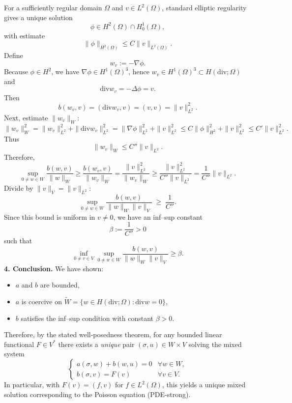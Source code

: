 For a sufficiently regular domain $\Omega$ and $v\in L^2(\Omega)$, standard elliptic
regularity gives a unique solution
\[
    \phi \in H^2(\Omega)\cap H_0^1(\Omega),
\]
with estimate
\[
    \|\phi\|_{H^2(\Omega)} \le C \|v\|_{L^2(\Omega)}.
\]
Define
\[
    w_v := -\nabla\phi.
\]
Because $\phi\in H^2$, we have $\nabla\phi \in H^1(\Omega)^3$, hence
$w_v\in H^1(\Omega)^3 \subset H(\mathrm{div};\Omega)$ and
\[
    \mathrm{div} w_v = -\Delta\phi = v.
\]
Then
\[
    b(w_v,v)
    = (\mathrm{div} w_v, v)
    = (v,v) = \|v\|_{L^2}^2.
\]
Next, estimate $\|w_v\|_W$:
\[
    \|w_v\|_W^2
    = \|w_v\|_{L^2}^2 + \|\mathrm{div} w_v\|_{L^2}^2
    = \|\nabla\phi\|_{L^2}^2 + \|v\|_{L^2}^2
    \le C\|\phi\|_{H^2}^2 + \|v\|_{L^2}^2
    \le C'\|v\|_{L^2}^2.
\]
Thus
\[
    \|w_v\|_W \le C'' \|v\|_{L^2}.
\]
Therefore,
\[
    \sup_{0\neq w\in W}
    \frac{b(w,v)}{\|w\|_W}
    \ge \frac{b(w_v,v)}{\|w_v\|_W}
    = \frac{\|v\|_{L^2}^2}{\|w_v\|_W}
    \ge \frac{\|v\|_{L^2}^2}{C''\|v\|_{L^2}}
    = \frac{1}{C''}\|v\|_{L^2}.
\]
Divide by $\|v\|_V = \|v\|_{L^2}$:
\[
    \sup_{0\neq w\in W}
    \frac{b(w,v)}{\|w\|_W\|v\|_V}
    \;\ge\; \frac{1}{C''}.
\]
Since this bound is uniform in $v\neq 0$, we have an inf--sup constant
\[
    \beta := \frac{1}{C''} > 0
\]
such that
\[
    \inf_{0\neq v\in V}
    \sup_{0\neq w\in W}
    \frac{b(w,v)}{\|w\|_W\|v\|_V}
    \ge \beta.
\]
\textbf{4. Conclusion.}
We have shown:
\begin{itemize}
    \item $a$ and $b$ are bounded,
    \item $a$ is coercive on $\widetilde W = \{ w\in H(\mathrm{div};\Omega) : \mathrm{div} w = 0\}$,
    \item $b$ satisfies the inf--sup condition with constant $\beta>0$.
\end{itemize}
Therefore, by the stated well-posedness theorem, for any bounded linear functional
$F\in V^\ast$ there exists a \emph{unique} pair $(\sigma,u)\in W\times V$ solving the mixed
system
\[
    \begin{cases}
        a(\sigma,w) + b(w,u) = 0 & \forall w\in W, \\
        b(\sigma,v) = F(v)       & \forall v\in V.
    \end{cases}
\]
In particular, with $F(v)=(f,v)$ for $f\in L^2(\Omega)$, this yields a unique mixed
solution corresponding to the Poisson equation (PDE-strong).
